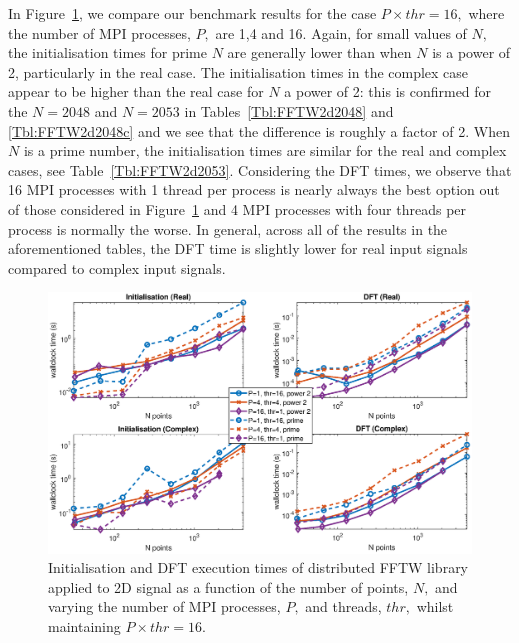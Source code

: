 \documentclass[a4paper]{article}
\begin{document}
In Figure~\ref{2DDistFFTW16}, we compare our benchmark results for the
case $P\times thr=16,$ where the number of MPI processes, $P,$ are 1,4
and 16. Again, for small values of $N,$ the initialisation times for
prime $N$ are generally lower than when $N$ is a power of 2,
particularly in the real case. The initialisation times in the complex
case appear to be higher than the real case for $N$ a power of 2: this
is confirmed for the $N=2048$ and $N=2053$ in
Tables~\ref{Tbl:FFTW2d2048} and \ref{Tbl:FFTW2d2048c} and we see that
the difference is roughly a factor of 2. When $N$ is a prime number,
the initialisation times are similar for the real and complex cases,
see Table~\ref{Tbl:FFTW2d2053}. Considering the DFT times, we observe that
16 MPI processes with 1 thread per process is nearly always the best
option out of those considered in Figure~\ref{2DDistFFTW16} and 4 MPI
processes with four threads per process is normally the worse. In
general, across all of the results in the aforementioned tables, the
DFT time is slightly lower for real input signals compared to complex
input signals.


\begin{figure}[htb]
    \centering
    \includegraphics[width=0.9\linewidth]{../results/fftw_2d_mpi_thr.eps}
  \caption{Initialisation and DFT execution times of distributed FFTW library applied to 2D signal as a function of the
    number of points, $N,$ and varying the number of MPI processes, $P,$ and threads, $thr,$ whilst maintaining $P\times thr=16.$}
  \label{2DDistFFTW16}
\end{figure}
\end{document}
